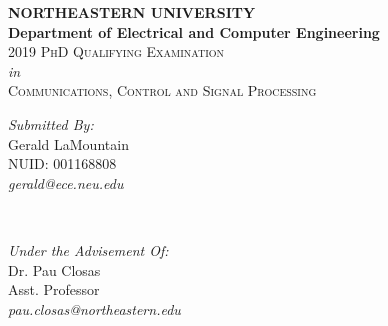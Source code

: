 \begin{titlepage}

\newcommand{\HRule}{\rule{\linewidth}{0.5mm}} %

\center %
 

\textbf{\LARGE NORTHEASTERN UNIVERSITY }\\[0.3cm] %
\textbf{\Large Department of Electrical and Computer Engineering}\\[0.5cm]


\vspace{0.4cm}
\textsc{ \huge 2019 PhD Qualifying Examination }\\[0.03cm] %
\textit{ \large in }\\[0.03cm]
\textsc{ \large Communications, Control and Signal Processing }\\[0.03cm]
\vspace{1.5cm}

\vspace{2cm}
 

\begin{minipage}{0.4\textwidth}
\begin{flushleft} \large
\emph{Submitted By:}\\[0.5cm]
Gerald LaMountain \\ NUID: 001168808 \\ \textit{gerald@ece.neu.edu} %
\end{flushleft}
\end{minipage}
~
\begin{minipage}{0.4\textwidth}
\begin{flushright} \large
\emph{Under the Advisement Of:}\\[0.5cm]
Dr. Pau Closas \\ Asst. Professor \\ \textit{pau.closas@northeastern.edu} %
\end{flushright}
\end{minipage}\\[1cm]


\end{titlepage}
